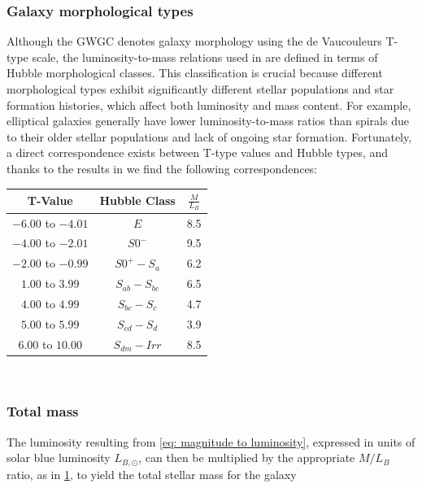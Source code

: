 \subsubsection{Galaxy morphological types}
Although the GWGC denotes galaxy morphology using the de Vaucouleurs T-type scale, the luminosity-to-mass relations used in \cite{Faber&Gallagher} are defined in terms of Hubble morphological classes.
This classification is crucial because different morphological types exhibit significantly different stellar populations and star formation histories, which affect both luminosity and mass content.
For example, elliptical galaxies generally have lower luminosity-to-mass ratios than spirals due to their older stellar populations and lack of ongoing star formation.
Fortunately, a direct correspondence exists between T-type values and Hubble types, and thanks to the results in \cite{Faber&Gallagher} we find the following correspondences:
\begin{table}[h!]
    \centering
    \begin{tabular}{ccc}
        T-Value & Hubble Class & $\frac{M}{L_B}$ \\
        \hline
        $-6.00$ to $-4.01$ & $E$ & 8.5\\
        $-4.00$ to $-2.01$ & $S0^-$ & 9.5\\
        $-2.00$ to $-0.99$ & $S0^+-S_a$ & 6.2\\
        $1.00$ to $3.99$ & $S_{ab}-S_{bc}$ & 6.5\\
        $4.00$ to $4.99$ & $S_{bc}-S_{c}$ & 4.7\\
        $5.00$ to $5.99$ & $S_{cd}-S_{d}$ & 3.9\\
        $6.00$ to $10.00$ & $S_{dm}-Irr$ & 8.5\\
        \hline
    \end{tabular}
    \label{tab: mass luminosity conversions tab}
\end{table}\\

\subsubsection{Total mass}
The luminosity resulting from \eqref{eq: magnitude to luminosity}, expressed in units of solar blue luminosity $L_{B,\odot}$, can then be multiplied by the appropriate $M/L_B$ ratio, as in \ref{tab: mass luminosity conversions tab}, to yield the total stellar mass for the galaxy
\begin{equation}
    
    \label{eq: total mass calculation}
\end{equation}



